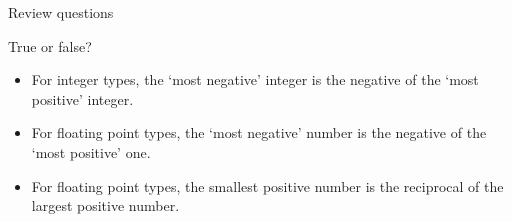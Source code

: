 
 {Review questions}

\begin{exercise}
  True or false?
  \begin{itemize}
  \item For integer types, the `most negative' integer is the negative
    of the `most positive' integer.
  \item For floating point types, the `most negative' number is the negative
    of the `most positive' one.
  \item For floating point types, the smallest positive number is the reciprocal
    of the largest positive number.
  \end{itemize}
\end{exercise}

